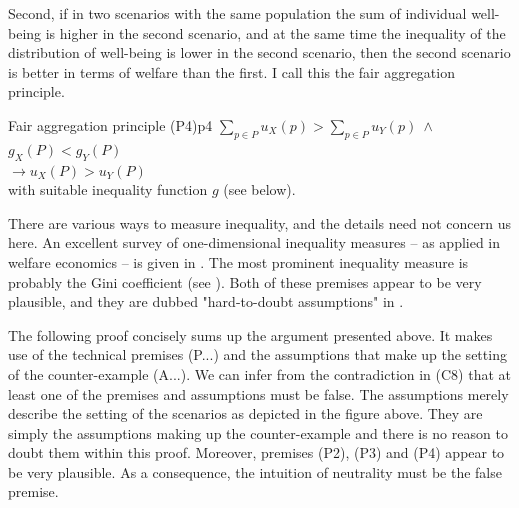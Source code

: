 Second, if in two scenarios with the same population the sum of individual well-being is higher in the second scenario, and at the same time the inequality of the distribution of well-being is lower in the second scenario, then the second scenario is better in terms of welfare than the first. I call this the fair aggregation principle. 

\begin{Premise}{Fair aggregation principle (P4)}{p4}
  \hspace*{.5cm} $
    \sum_{p\in P} u_X(p) > \sum_{p\in P} u_Y(p) \ \wedge
  $ \\
  \hspace*{.5cm} $g_X(P) < g_Y(P)
  $ \\
  $
    \rightarrow u_X(P) > u_Y(P)
  $ \\
  with suitable inequality function $g$ (see below).
\end{Premise}

There are various ways to measure inequality, and the details need not concern us here. An excellent survey of one-dimensional inequality measures – as applied in welfare economics – is given in . The most prominent inequality measure is probably the Gini coefficient (see ). Both of these premises appear to be very plausible, and they are dubbed "hard-to-doubt assumptions" in . 

The following proof concisely sums up the argument presented above. It makes use of the technical premises (P...) and the assumptions that make up the setting of the counter-example (A...). We can infer from the contradiction in (C8) that at least one of the premises and assumptions must be false. The assumptions merely describe the setting of the scenarios as depicted in the figure above. They are simply the assumptions making up the counter-example and there is no reason to doubt them within this proof. Moreover, premises (P2), (P3) and (P4) appear to be very plausible. As a consequence, the intuition of neutrality must be the false premise. 

